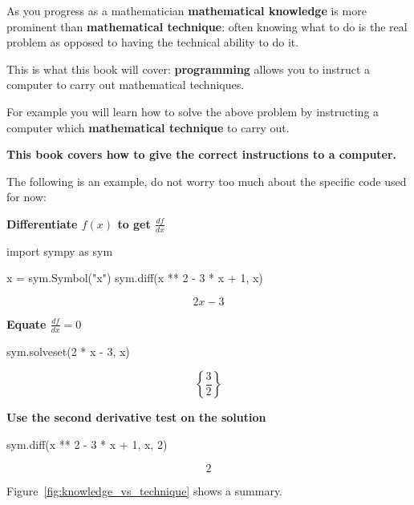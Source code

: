 As you progress as a mathematician \textbf{mathematical knowledge} is more prominent
than \textbf{mathematical technique}: often knowing what to do is the real problem as
opposed to having the technical ability to do it.

This is what this book will cover: \textbf{programming} allows you to instruct a
computer to carry out mathematical techniques.

For example you will learn how to solve the above problem by instructing a
computer which \textbf{mathematical technique} to carry out.

\textbf{This book covers how to give the correct instructions to a
computer.}

The following is an example, do not worry too much about the specific code used
for now:


\textbf{Differentiate \(f(x)\) to get \(\frac{df}{dx}\)}

\begin{pyin}
import sympy as sym

x = sym.Symbol("x")
sym.diff(x ** 2 - 3 * x + 1, x)
\end{pyin}

\[
    2x - 3
\]

\textbf{Equate \(\frac{df}{dx}=0\)}

\begin{pyin}
sym.solveset(2 * x - 3, x)
\end{pyin}

\[
\left\{\frac{3}{2}\right\}
\]

\textbf{Use the second derivative test on the solution}

\begin{pyin}
sym.diff(x ** 2 - 3 * x + 1, x, 2)
\end{pyin}

\[2\]

Figure~\ref{fig:knowledge_vs_technique} shows a summary.

